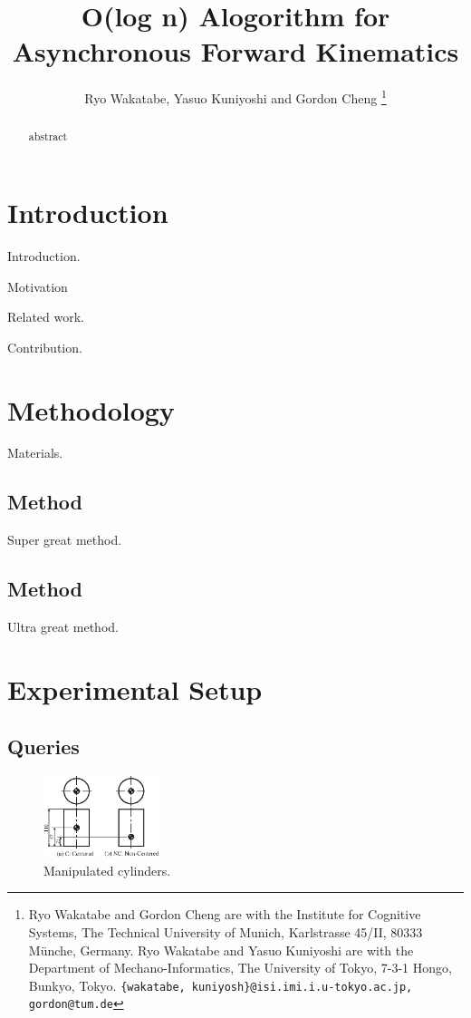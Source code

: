 \documentclass[letterpaper, 10 pt, conference]{IEEEtran}  %
\title{\LARGE \bf
    O(log n) Alogorithm for Asynchronous Forward Kinematics
}
\author{Ryo Wakatabe, Yasuo Kuniyoshi and Gordon Cheng%
    \thanks{Ryo Wakatabe and Gordon Cheng are with the Institute for Cognitive Systems, The Technical University of Munich, Karlstrasse 45/II, 80333 Münche, Germany. Ryo Wakatabe and Yasuo Kuniyoshi are with the Department of Mechano-Informatics, The University of Tokyo, 7-3-1 Hongo, Bunkyo, Tokyo.  {\tt\small \{wakatabe, kuniyosh\}@isi.imi.i.u-tokyo.ac.jp, gordon@tum.de}}%

}
\begin{document}
\maketitle
\thispagestyle{empty}
\pagestyle{empty}

\begin{abstract}
abstract

\end{abstract}


\section{Introduction}
Introduction\cite{yingjie2005mld}.

Motivation

Related work.

Contribution.



\section{Methodology}
Materials.

\subsection{Method}
Super great method.

\subsection{Method}
Ultra great method.


\section{Experimental Setup}
\subsection{Queries}

\begin{figure}[t!]
 \centering
 \includegraphics[width=0.3\textwidth]{figure/cylinder-property.eps}
 \caption{Manipulated cylinders.} 
 \label{fig:cylinder}
\end{figure}
\end{document}
